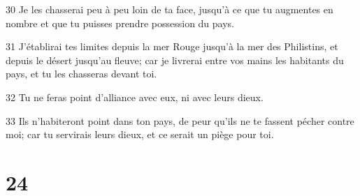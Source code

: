 \par 30 Je les chasserai peu à peu loin de ta face, jusqu'à ce que tu augmentes en nombre et que tu puisses prendre possession du pays.
\par 31 J'établirai tes limites depuis la mer Rouge jusqu'à la mer des Philistins, et depuis le désert jusqu'au fleuve; car je livrerai entre vos mains les habitants du pays, et tu les chasseras devant toi.
\par 32 Tu ne feras point d'alliance avec eux, ni avec leurs dieux.
\par 33 Ils n'habiteront point dans ton pays, de peur qu'ils ne te fassent pécher contre moi; car tu servirais leurs dieux, et ce serait un piège pour toi.

\chapter{24}

